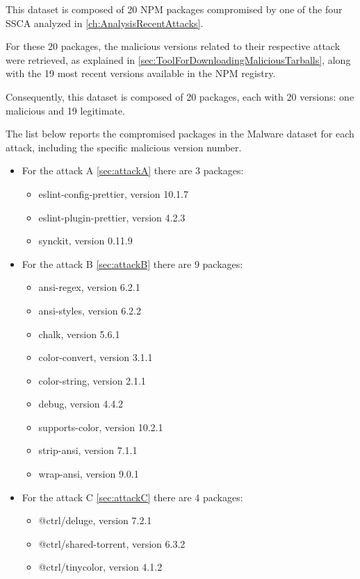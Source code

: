 This dataset is composed of 20 \ac{NPM} packages
compromised by one of the four \ac{SSCA} analyzed in 
\cref{ch:AnalysisRecentAttacks}.

For these 20 packages, the malicious versions related to 
their respective attack were retrieved,
as explained in \cref{sec:ToolForDownloadingMaliciousTarballs},
along with the 19 most recent versions available in the \ac{NPM} registry.

Consequently, this dataset is composed of 20 packages, each with 20 versions:
one malicious and 19 legitimate.


The list below reports the compromised packages in the Malware dataset for each attack,
including the specific malicious version number.
\begin{itemize}
    \item For the attack A \cref{sec:attackA} there are 3 packages:
    \begin{itemize}
        \item eslint-config-prettier, version 10.1.7
        \item eslint-plugin-prettier, version 4.2.3
        \item synckit, version 0.11.9
    \end{itemize}
    \item For the attack B \cref{sec:attackB} there are 9 packages:
    \begin{itemize}
        \item ansi-regex, version 6.2.1
        \item ansi-styles, version 6.2.2
        \item chalk, version 5.6.1
        \item color-convert, version 3.1.1
        \item color-string, version 2.1.1
        \item debug, version 4.4.2
        \item supports-color, version 10.2.1
        \item strip-ansi, version 7.1.1
        \item wrap-ansi, version 9.0.1
    \end{itemize}
    \item For the attack C \cref{sec:attackC} there are 4 packages:
        \begin{itemize}
            \item @ctrl/deluge, version 7.2.1
            \item @ctrl/shared-torrent, version 6.3.2
            \item @ctrl/tinycolor, version 4.1.2

\end{itemize}
\end{itemize}
